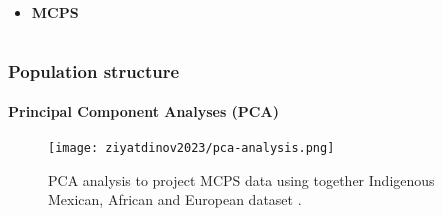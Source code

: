 \begin{frame}
\begin{columns}
        \begin{column}{0.33\textwidth}
            \begin{itemize}[noitemsep,topsep=0pt]
                \item \textbf{\sffamily\color{primary-color} MCPS}
            \end{itemize}
        \end{column}
    \end{columns}
\end{frame}

\begin{frame}
    \frametitle{Population structure}
    \framesubtitle{Principal Component Analyses (PCA)}

    \begin{figure}[htpb]
        \centering
        \texttt{[image: ziyatdinov2023/pca-analysis.png]}
        \caption{PCA analysis to project MCPS data using together Indigenous Mexican, African and European dataset \parencite{ziyatdinov2023}.}
        \label{fig:mcps-pca-1}
    \end{figure}

\end{frame}